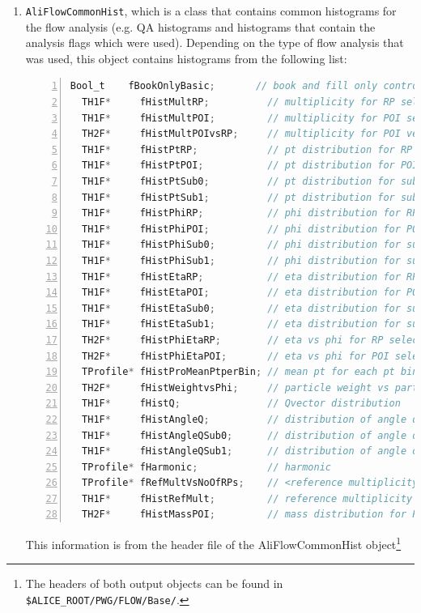\documentclass[a4paper]{book}
\numberwithin{equation}{subsection}
\begin{document}
\begin{enumerate}
\item \texttt{AliFlowCommonHist}, which is a class that contains common histograms for the flow analysis (e.g. QA histograms and histograms that contain the analysis flags which were used). Depending on the type of flow analysis that was used, this object contains histograms from the following list:
\begin{lstlisting}[language=C, numbers=left]
  Bool_t    fBookOnlyBasic;       // book and fill only control histos needed for all methods
  TH1F*     fHistMultRP;          // multiplicity for RP selection
  TH1F*     fHistMultPOI;         // multiplicity for POI selection
  TH2F*     fHistMultPOIvsRP;     // multiplicity for POI versus RP
  TH1F*     fHistPtRP;            // pt distribution for RP selection
  TH1F*     fHistPtPOI;           // pt distribution for POI selection
  TH1F*     fHistPtSub0;          // pt distribution for subevent 0
  TH1F*     fHistPtSub1;          // pt distribution for subevent 1
  TH1F*     fHistPhiRP;           // phi distribution for RP selection
  TH1F*     fHistPhiPOI;          // phi distribution for POI selection
  TH1F*     fHistPhiSub0;         // phi distribution for subevent 0
  TH1F*     fHistPhiSub1;         // phi distribution for subevent 1
  TH1F*     fHistEtaRP;           // eta distribution for RP selection
  TH1F*     fHistEtaPOI;          // eta distribution for POI selection
  TH1F*     fHistEtaSub0;         // eta distribution for subevent 0
  TH1F*     fHistEtaSub1;         // eta distribution for subevent 1
  TH2F*     fHistPhiEtaRP;        // eta vs phi for RP selection
  TH2F*     fHistPhiEtaPOI;       // eta vs phi for POI selection
  TProfile* fHistProMeanPtperBin; // mean pt for each pt bin (for POI selection)
  TH2F*     fHistWeightvsPhi;     // particle weight vs particle phi
  TH1F*     fHistQ;               // Qvector distribution
  TH1F*     fHistAngleQ;          // distribution of angle of Q vector
  TH1F*     fHistAngleQSub0;      // distribution of angle of subevent 0 Q vector
  TH1F*     fHistAngleQSub1;      // distribution of angle of subevent 1 Q vector
  TProfile* fHarmonic;            // harmonic 
  TProfile* fRefMultVsNoOfRPs;    // <reference multiplicity> versus # of RPs
  TH1F*     fHistRefMult;         // reference multiplicity distribution
  TH2F*     fHistMassPOI;         // mass distribution for POI selection \end{lstlisting}
  This information is from the header file of the AliFlowCommonHist object\footnote{The headers of both output objects can be found in \texttt{\$ALICE\_ROOT/PWG/FLOW/Base/}.}

\end{enumerate}
\end{document}
